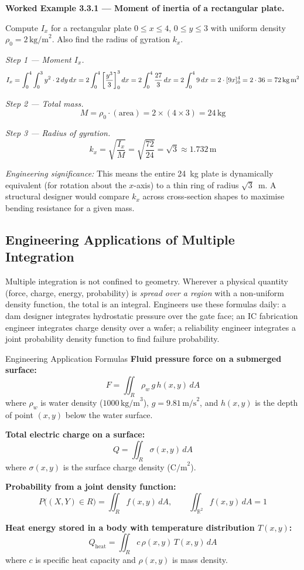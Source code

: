 \documentclass[12pt,a4paper]{article}
\begin{document}
\textbf{Worked Example 3.3.1 --- Moment of inertia of a rectangular plate.}

Compute \(I_x\) for a rectangular plate \(0 \leq x \leq 4\), \(0 \leq y \leq 3\) with uniform density \(\rho_0 = 2\,\text{kg/m}^2\). Also find the radius of gyration \(k_x\).

\textit{Step 1 --- Moment \(I_x\).}
\[
I_x = \int_0^4 \int_0^3 y^2 \cdot 2\,dy\,dx
= 2 \int_0^4 \left[\frac{y^3}{3}\right]_0^3 dx
= 2 \int_0^4 \frac{27}{3}\,dx
= 2 \int_0^4 9\,dx
= 2 \cdot [9x]_0^4
= 2 \cdot 36 = 72\,\text{kg\,m}^2
\]

\textit{Step 2 --- Total mass.}
\[
M = \rho_0 \cdot (\text{area}) = 2 \times (4 \times 3) = 24\,\text{kg}
\]

\textit{Step 3 --- Radius of gyration.}
\[
k_x = \sqrt{\frac{I_x}{M}} = \sqrt{\frac{72}{24}} = \sqrt{3} \approx 1.732\,\text{m}
\]

\textit{Engineering significance:} This means the entire 24~kg plate is dynamically equivalent (for rotation about the \(x\)-axis) to a thin ring of radius \(\sqrt{3}\)~m. A structural designer would compare \(k_x\) across cross-section shapes to maximise bending resistance for a given mass.

\subsection{Engineering Applications of Multiple Integration}

Multiple integration is not confined to geometry. Wherever a physical quantity (force, charge, energy, probability) is \emph{spread over a region} with a non-uniform density function, the total is an integral. Engineers use these formulas daily: a dam designer integrates hydrostatic pressure over the gate face; an IC fabrication engineer integrates charge density over a wafer; a reliability engineer integrates a joint probability density function to find failure probability.

\begin{infobox}{Engineering Application Formulas}
\textbf{Fluid pressure force on a submerged surface:}
\[
F = \iint_R \rho_w\, g\, h(x,y)\,dA
\]
where \(\rho_w\) is water density (\(1000\,\text{kg/m}^3\)), \(g = 9.81\,\text{m/s}^2\), and \(h(x,y)\) is the depth of point \((x,y)\) below the water surface.

\textbf{Total electric charge on a surface:}
\[
Q = \iint_R \sigma(x,y)\,dA
\]
where \(\sigma(x,y)\) is the surface charge density (\(\text{C/m}^2\)).

\textbf{Probability from a joint density function:}
\[
P\bigl((X,Y)\in R\bigr) = \iint_R f(x,y)\,dA, \qquad \iint_{\mathbb{R}^2} f(x,y)\,dA = 1
\]

\textbf{Heat energy stored in a body with temperature distribution \(T(x,y)\):}
\[
Q_{\text{heat}} = \iint_R c\,\rho(x,y)\,T(x,y)\,dA
\]
where \(c\) is specific heat capacity and \(\rho(x,y)\) is mass density.
\end{infobox}
\end{document}
